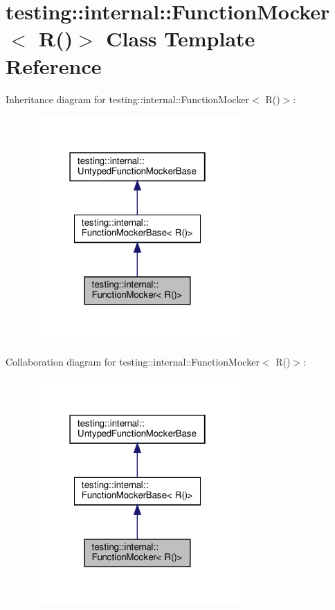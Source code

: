 \hypertarget{classtesting_1_1internal_1_1_function_mocker_3_01_r_07_08_4}{}\section{testing\+:\+:internal\+:\+:Function\+Mocker$<$ R()$>$ Class Template Reference}
\label{classtesting_1_1internal_1_1_function_mocker_3_01_r_07_08_4}


Inheritance diagram for testing\+:\+:internal\+:\+:Function\+Mocker$<$ R()$>$\+:
\nopagebreak
\begin{figure}[H]
\begin{center}
\leavevmode
\includegraphics[width=226pt]{classtesting_1_1internal_1_1_function_mocker_3_01_r_07_08_4__inherit__graph}
\end{center}
\end{figure}


Collaboration diagram for testing\+:\+:internal\+:\+:Function\+Mocker$<$ R()$>$\+:
\nopagebreak
\begin{figure}[H]
\begin{center}
\leavevmode
\includegraphics[width=226pt]{classtesting_1_1internal_1_1_function_mocker_3_01_r_07_08_4__coll__graph}
\end{center}
\end{figure}
